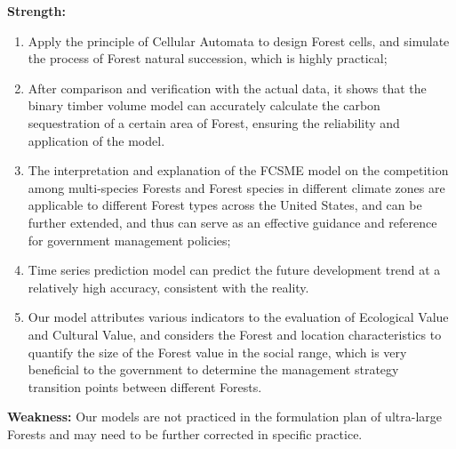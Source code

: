 \documentclass{mcmthesis}
\numberwithin{figure}{section}
\numberwithin{table}{section}
\numberwithin{equation}{section}
\begin{document}
\textbf{Strength:}
\begin{enumerate}
  \item Apply the principle of Cellular Automata to design Forest cells, 
  and simulate the process of Forest natural succession, which is highly 
  practical;
  \item After comparison and verification with the actual data, it shows that the binary timber volume model can accurately calculate the carbon sequestration of a certain area of Forest, ensuring the reliability and application of the model.
  \item The interpretation and explanation of the FCSME model on the competition among multi-species Forests and Forest species in different climate zones are applicable to different Forest types across the United States, and can be further extended, and thus can serve as an effective guidance and reference for government management policies;
  \item Time series prediction model can predict the future development trend at a relatively high accuracy, consistent with the reality.
  \item Our model attributes various indicators to the evaluation of Ecological Value and Cultural Value, and considers the Forest and location characteristics to quantify the size of the Forest value in the social range, which is very beneficial to the government to determine the management strategy transition points between different Forests.


\end{enumerate}

\textbf{Weakness:}
Our models are not practiced in the formulation plan of ultra-large Forests 
and may need to be further corrected in specific practice.
\end{document}

